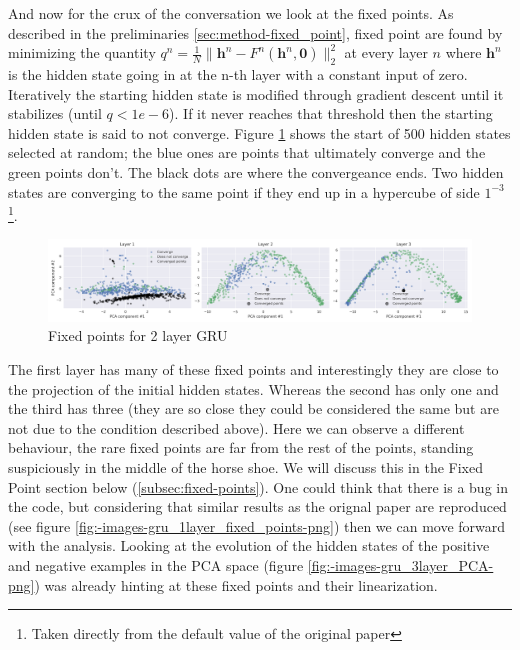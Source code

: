 \documentclass{article}
\begin{document}
And now for the crux of the conversation we look at the fixed points. As described in the preliminaries \ref{sec:method-fixed_point}, fixed point are found by minimizing the quantity $q^{n}=\frac{1}{N}\|\textbf{h}^{n}-F^{n}(\textbf{h}^{n}, \textbf{0})\|_2^2$ at every layer $n$ where  $\textbf{h}^n$ is the hidden state going in at the n-th layer with a constant input of zero. Iteratively the starting hidden state is modified through gradient descent until it stabilizes (until $q < 1e-6$). If it never reaches that threshold then the starting hidden state is said to not converge. Figure \ref{fig:-images-gru_3layer_fixed_points-png} shows the start of 500 hidden states selected at random; the blue ones are points that ultimately converge and the green points don't. The black dots are where the convergeance ends. Two hidden states are converging to the same point if they end up in a hypercube of side $1^{-3}$ \footnote{Taken directly from the default value of the original paper}.
\begin{figure}[H]
  \centering
  \includegraphics[width=1\textwidth]{../images/gru_3layer_fixed_points.png}
  \caption{Fixed points for 2 layer GRU}
  \label{fig:-images-gru_3layer_fixed_points-png}
\end{figure}
The first layer has many of these fixed points and interestingly they are close to the projection of the initial hidden states. Whereas the second has only one and the third has three (they are so close they could be considered the same but are not due to the condition described above). Here we can observe a different behaviour, the rare fixed points are far from the rest of the points, standing suspiciously in the middle of the horse shoe. We will discuss this in the Fixed Point section below (\ref{subsec:fixed-points}). One could think that there is a bug in the code, but considering that similar results as the orignal paper are reproduced (see figure \ref{fig:-images-gru_1layer_fixed_points-png}) then we can move forward with the analysis. Looking at the evolution of the hidden states of the positive and negative examples in the PCA space (figure \ref{fig:-images-gru_3layer_PCA-png}) was already hinting at these fixed points and their linearization.

\end{document}
